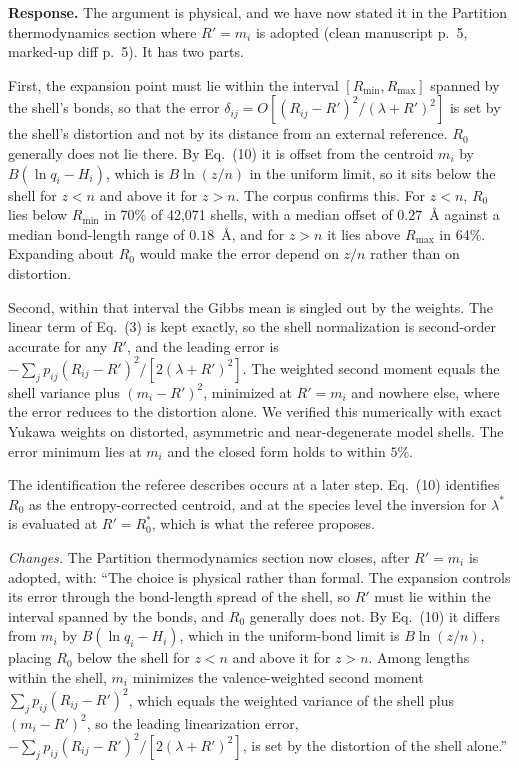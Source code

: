 \documentclass[11pt]{article}
\begin{document}
\textbf{Response.}  The argument is physical, and we have now stated
it in the Partition thermodynamics section where $R'=m_i$ is adopted
(clean manuscript p.~5, marked-up diff p.~5).  It has two parts.

First, the expansion point must lie within the interval
$[R_{\min},R_{\max}]$ spanned by the shell's bonds, so that the error
$\delta_{ij}=O[(R_{ij}-R')^2/(\lambda+R')^2]$ is set by the shell's
distortion and not by its distance from an external reference.
$R_0$ generally does not lie there.  By Eq.~(10) it is offset from
the centroid $m_i$ by $B(\ln q_i-H_i)$, which is $B\ln(z/n)$ in the
uniform limit, so it sits below the shell for $z<n$ and above it for
$z>n$.  The corpus confirms this.  For $z<n$, $R_0$ lies below
$R_{\min}$ in 70\% of 42{,}071 shells, with a median offset of
$0.27$~\AA{} against a median bond-length range of $0.18$~\AA, and
for $z>n$ it lies above $R_{\max}$ in 64\%.  Expanding about $R_0$
would make the error depend on $z/n$ rather than on distortion.

Second, within that interval the Gibbs mean is singled out by the
weights.  The linear term of Eq.~(3) is kept exactly, so the shell
normalization is second-order accurate for any $R'$, and the leading
error is $-\sum_j p_{ij}(R_{ij}-R')^2/[2(\lambda+R')^2]$.  The
weighted second moment equals the shell variance plus $(m_i-R')^2$,
minimized at $R'=m_i$ and nowhere else, where the error reduces to
the distortion alone.  We verified this numerically with exact Yukawa
weights on distorted, asymmetric and near-degenerate model shells.
The error minimum lies at $m_i$ and the closed form holds to within
$5\%$.

The identification the referee describes occurs at a later step.
Eq.~(10) identifies $R_0$ as the entropy-corrected centroid, and at
the species level the inversion for $\lambda^*$ is evaluated at
$R'=R_0^*$, which is what the referee proposes.

\emph{Changes.}  The Partition thermodynamics section now closes,
after $R'=m_i$ is adopted, with: ``The choice is physical rather than
formal.  The expansion controls its error through the bond-length
spread of the shell, so $R'$ must lie within the interval spanned by
the bonds, and $R_0$ generally does not.  By Eq.~(10) it differs from
$m_i$ by $B(\ln q_i-H_i)$, which in the uniform-bond limit is
$B\ln(z/n)$, placing $R_0$ below the shell for $z<n$ and above it for
$z>n$.  Among lengths within the shell, $m_i$ minimizes the
valence-weighted second moment $\sum_j p_{ij}(R_{ij}-R')^2$, which
equals the weighted variance of the shell plus $(m_i-R')^2$, so the
leading linearization error, $-\sum_j p_{ij}(R_{ij}-R')^2/[2(\lambda+R')^2]$,
is set by the distortion of the shell alone.''
\end{document}
